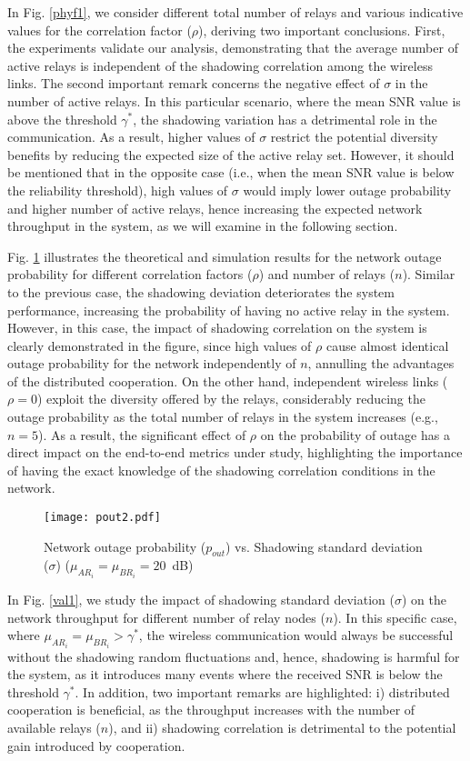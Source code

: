 \documentclass[12pt,draftcls, onecolumn]{IEEEtran}
\begin{document}
In Fig. \ref{phyf1}, we consider different total number of relays and various indicative values for the correlation factor ($\rho$), deriving two important conclusions. First, the experiments validate our analysis, demonstrating that the average number of active relays is independent of the shadowing correlation among the wireless links. The second important remark concerns the negative effect of $\sigma$ in the number of active relays. In this particular scenario, where the mean SNR value is above the threshold $\gamma^*$, the shadowing variation has a detrimental role in the communication. As a result, higher values of $\sigma$ restrict the potential diversity benefits by reducing the expected size of the active relay set. However, it should be mentioned that in the opposite case (i.e., when the mean SNR value is below the reliability threshold), high values of $\sigma$ would imply lower outage probability and higher number of active relays, hence increasing the expected network throughput in the system, as we will examine in the following section.

Fig. \ref{phyf2} illustrates the theoretical and simulation results for the network outage probability for different correlation factors ($\rho$) and number of relays ($n$). Similar to the previous case, the shadowing deviation deteriorates the system performance, increasing the probability of having no active relay in the system. However, in this case, the impact of shadowing correlation on the system is clearly demonstrated in the figure, since high values of $\rho$ cause almost identical outage probability for the network independently of $n$, annulling the advantages of the distributed cooperation. On the other hand, independent wireless links ($\rho=0$) exploit the diversity offered by the relays, considerably reducing the outage probability as the total number of relays in the system increases (e.g., $n=5$). As a result, the significant effect of $\rho$ on the probability of outage has a direct impact on the end-to-end metrics under study, highlighting the importance of having the exact knowledge of the shadowing correlation conditions in the network.

\begin{figure}[htb]
\centering
\texttt{[image: pout2.pdf]}
\caption{Network outage probability ($p_{out}$) vs. Shadowing standard deviation ($\sigma$) ($\mu_{AR_i}=\mu_{BR_i}=20$~dB)}\label{phyf2}
\end{figure}

In Fig. \ref{val1}, we study the impact of shadowing standard deviation ($\sigma$) on the network throughput for different number of relay nodes ($n$). In this specific case, where $\mu_{AR_i}=\mu_{BR_i}>\gamma^*$, the wireless communication would always be successful without the shadowing random fluctuations and, hence, shadowing is harmful for the system, as it introduces many events where the received SNR is below the threshold $\gamma^*$. In addition, two important remarks are highlighted: i) distributed cooperation is beneficial, as the throughput increases with the number of available relays ($n$), and ii) shadowing correlation is detrimental to the potential gain introduced by cooperation.
\end{document}

